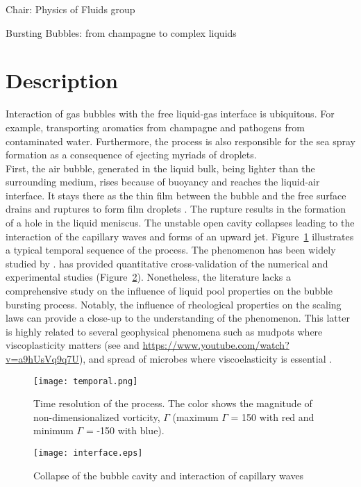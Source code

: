 \documentclass[a4paper,10pt]{article}
\begin{document}
\noindent Chair: Physics of Fluids group
\begin{center}
 \begin{LARGE}
  Bursting Bubbles: from champagne to complex liquids
 \end{LARGE}
\end{center}
\section*{Description}
Interaction of gas bubbles with the free liquid-gas interface is ubiquitous. For example, transporting aromatics from champagne and pathogens from contaminated water. Furthermore, the process is also responsible for the sea spray formation as a consequence of ejecting myriads of droplets.\\
First, the air bubble, generated in the liquid bulk, being lighter than the surrounding medium, rises because of buoyancy and reaches the liquid-air interface. It stays there as the thin film between the bubble and the free surface drains and ruptures to form film droplets \citep{lhuissier2012bursting}. The rupture results in the formation of a hole in the liquid meniscus. The unstable open cavity collapses leading to the interaction of the capillary waves and forms of an upward jet.
Figure~\ref{Figure::Typical} illustrates a typical temporal sequence of the process. The phenomenon has been widely studied by \cite{duchemin2002jet, walls2015jet, deike2018dynamics, gordillo2019capillary}.
\cite{deike2018dynamics} has provided quantitative cross-validation of the numerical and experimental studies (Figure~\ref{Figure::Waves}). Nonetheless, the literature lacks a comprehensive study on the influence of liquid pool properties on the bubble bursting process. Notably, the influence of rheological properties on the scaling laws can provide a close-up to the understanding of the phenomenon. This latter is highly related to several geophysical phenomena such as mudpots where viscoplasticity matters (see \citet{sanjay_lohse_jalaal_2021} and \href{https://www.youtube.com/watch?v=a9hUsVq9q7U}{https://www.youtube.com/watch?v=a9hUsVq9q7U}), and spread of microbes where viscoelasticity is essential \citet{walls2017quantifying, bourouiba2021fluid}.
\begin{figure}[H]
\begin{center}
 \texttt{[image: temporal.png]}
 \caption{Time resolution of the process. The color shows the magnitude of non-dimensionalized vorticity, $\Gamma$ (maximum $\Gamma$ = 150 with red and minimum $\Gamma$ = -150 with blue).}
 \label{Figure::Typical}
\end{center}
\end{figure}
\begin{figure}[H]
\begin{center}
 \texttt{[image: interface.eps]}
 \caption{Collapse of the bubble cavity and interaction of capillary waves}
 \label{Figure::Waves}
\end{center}
\end{figure}
\end{document}
